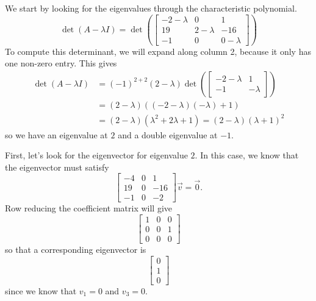 \begin{exampleSol}
We start by looking for the eigenvalues through the characteristic polynomial.
\[ \det(A - \lambda I) = \det\left( \begin{bmatrix} -2-\lambda & 0 & 1 \\ 19 & 2-\lambda & -16 \\ -1 & 0 & 0-\lambda \end{bmatrix}\right) \] To compute this determinant, we will expand along column 2, because it only has one non-zero entry. This gives
\[ \begin{split}
\det(A - \lambda I) &= (-1)^{2+2} (2-\lambda)\det\left( \begin{bmatrix} -2-\lambda & 1 \\ -1 & -\lambda \end{bmatrix}\right) \\
&= (2-\lambda)((-2-\lambda)(-\lambda) + 1) \\
&= (2-\lambda)(\lambda^2 + 2\lambda + 1) = (2-\lambda)(\lambda+1)^2
\end{split}
\] so we have an eigenvalue at $2$ and a double eigenvalue at $-1$. 

First, let's look for the eigenvector for eigenvalue $2$. In this case, we know that the eigenvector must satisfy
\[ \begin{bmatrix} -4 & 0 & 1 \\ 19 & 0 & -16 \\ -1 & 0 & -2 \end{bmatrix} \vec{v} = \vec{0}. \] Row reducing the coefficient matrix will give
\[ \begin{bmatrix} 1 & 0 & 0 \\ 0 & 0 & 1 \\ 0 & 0 & 0 \end{bmatrix} \] so that a corresponding eigenvector is \[ \begin{bmatrix} 0 \\ 1 \\ 0 \end{bmatrix} \] since we know that $v_1 = 0$ and $v_3 = 0$. 


\end{exampleSol}
